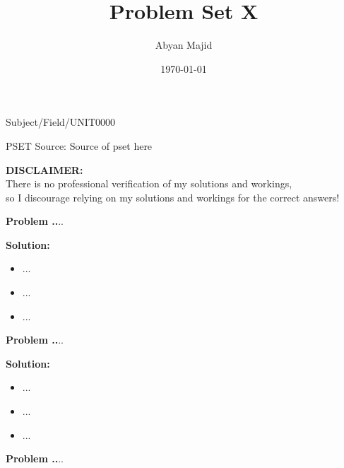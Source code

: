 \documentclass{article}
\theoremstyle{problemstyle}
\newenvironment{boxedproblem}[1]
{\begin{tcolorbox}[colback=white, colframe=black, boxrule=0.5pt]\noindent\textbf{Problem #1.}}
{\end{tcolorbox}}
\begin{document}
\title{Problem Set X}
\author{Abyan Majid}
\date{\today}
\maketitle

\vspace{-0.25cm}
{\centering Subject/Field/UNIT0000 \par}
{\centering PSET Source: Source of pset here \par}

\noindent \hrulefill
\begin{center}
    \textbf{DISCLAIMER:} \\
    There is no professional verification of my solutions and workings, \\
    so I discourage relying on my solutions and workings for the correct answers! \\
\end{center}
\noindent \hrulefill
\vspace{0.25cm}


\begin{boxedproblem}{1}
...
\end{boxedproblem}

\textbf{Solution:}
\begin{itemize}[label={},leftmargin=1.25cm,nosep]
    \item ...
    \item ...
    \item ...
\end{itemize}


\begin{boxedproblem}{2}
...
\end{boxedproblem}

\textbf{Solution:}
\begin{itemize}[label={},leftmargin=1.25cm,nosep]
    \item ...
    \item ...
    \item ...
\end{itemize}


\begin{boxedproblem}{3}
...
\end{boxedproblem}
\end{document}
